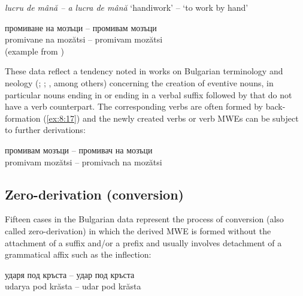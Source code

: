 \documentclass[output=paper]{langsci/langscibook}
\begin{document}
\begin{exe}
\ex \label{ex:8:16}
\settowidth{}
\textit{lucru de mână -- a lucra de mână}  
‘handiwork’ -- ‘to work by hand’
\end{exe}

\begin{exe}
\ex \label{ex:8:17}
\settowidth{}
\gll промиване на мозъци -- промивам мозъци\\
promivane na mozătsi -- promivam mozătsi\\  
 (example from \citealt{blagoeva2008})
\end{exe}

These data reflect a tendency noted in works on Bulgarian terminology
and neology (\citealt{baltova1986}; \citealt{kolkovska1993}; \citealt{kostova2013}, among others) concerning the creation of eventive nouns, in particular nouns
ending in  or ending in a verbal suffix followed by   that do
not have a verb counterpart. The corresponding verbs are often formed
by back-formation (\ref{ex:8:17}) and the newly created verbs or verb MWEs can be
subject to further derivations:

\begin{exe}
\ex \label{ex:8:18}
\settowidth{}
\gll промивам мозъци -- промивач на мозъци\\
promivam mozătsi  --  promivach na mozătsi\\  
\end{exe}


\subsection{Zero-derivation (conversion)}
\label{zero}

Fifteen cases in the Bulgarian data represent the process of conversion (also
called zero-derivation) in which the derived MWE is formed without the
attachment of a suffix and/or a prefix and usually involves detachment
of a grammatical affix such as the inflection:

\begin{exe}
\ex \label{ex:8:19}
\settowidth{}
\gll ударя под кръста -- удар под кръста\\
udarya pod krăsta  -- udar pod krăsta\\  
\end{exe}
\end{document}
